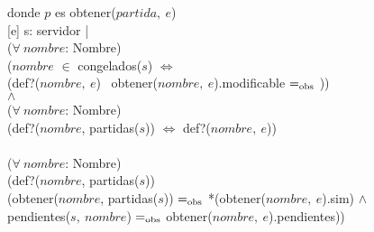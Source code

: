 \begin{Representacion}
    \vspace{2mm}
    donde $p$ es obtener($partida,\ e$) \\

    [e]{
        s: servidor | \\
            \tab ($\forall\ nombre$: Nombre)\\
                \tab\tab ($nombre$ $\in$ congelados($s$) $\Leftrightarrow$ \\
                \tab\tab (def?($nombre,\ e$) \yluego\ obtener($nombre,\ e$).modificable $=_{\mathrm{obs}}$ \false)) \\
            \tab $\wedge$ \\
            \tab ($\forall\ nombre$: Nombre)\\
                \tab\tab (def?($nombre$, partidas($s$)) $\Leftrightarrow$ def?($nombre,\ e$)) \\
            \tab \yluego \\
            \tab ($\forall\ nombre$: Nombre)\\
                \tab\tab (def?($nombre$, partidas($s$)) \impluego \\ 
                \tab\tab (obtener($nombre$, partidas($s$)) $=_{\mathrm{obs}}$ *(obtener($nombre,\ e$).sim) $\wedge$ \\
                \tab\tab pendientes($s,\ nombre$) $=_{\mathrm{obs}}$ obtener($nombre,\ e$).pendientes)) \\
    }  

  \end{Representacion}
  
